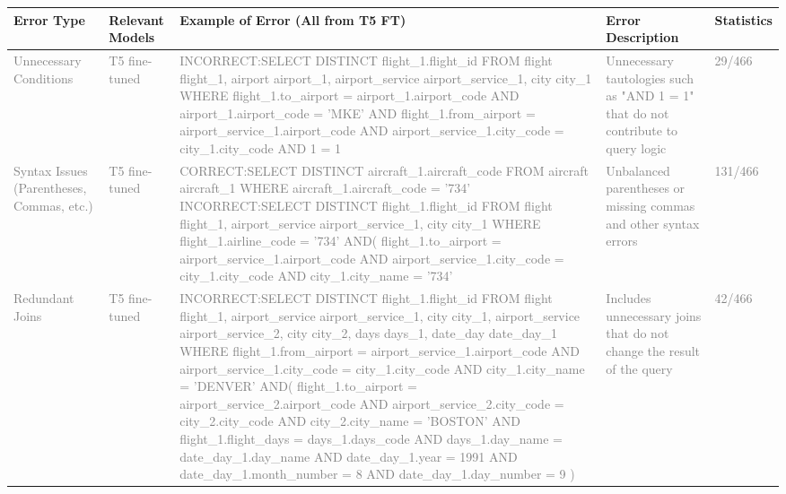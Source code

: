 \documentclass{article}
\begin{document}
\begin{landscape}
\begin{table}
  \centering
  \begin{tabular}{p{2cm}p{2cm}p{10cm}p{6cm}p{2cm}}
    \toprule
    \textbf{Error Type} & \textbf{Relevant Models} & \textbf{Example of Error (All from T5 FT)} & \textbf{Error Description} & \textbf{Statistics} \\
    \midrule
    \textcolor{gray}{Unnecessary Conditions} & \textcolor{gray}{T5 fine-tuned} & \textcolor{gray}{INCORRECT:\newline SELECT DISTINCT flight\_1.flight\_id FROM flight flight\_1, airport airport\_1, airport\_service airport\_service\_1, city city\_1 WHERE flight\_1.to\_airport = airport\_1.airport\_code AND airport\_1.airport\_code = 'MKE' AND flight\_1.from\_airport = airport\_service\_1.airport\_code AND airport\_service\_1.city\_code = city\_1.city\_code AND 1 = 1} & \textcolor{gray}{Unnecessary tautologies such as "AND 1 = 1" that do not contribute to query logic} & \textcolor{gray}{29/466} \\
    \midrule
    \textcolor{gray}{Syntax Issues (Parentheses, Commas, etc.)} & \textcolor{gray}{T5 fine-tuned} & \textcolor{gray}{CORRECT:\newline SELECT DISTINCT aircraft\_1.aircraft\_code FROM aircraft aircraft\_1 WHERE aircraft\_1.aircraft\_code = '734' \newline \newline INCORRECT:\newline SELECT DISTINCT flight\_1.flight\_id FROM flight flight\_1, airport\_service airport\_service\_1, city city\_1 WHERE flight\_1.airline\_code = '734' AND( flight\_1.to\_airport = airport\_service\_1.airport\_code AND airport\_service\_1.city\_code = city\_1.city\_code AND city\_1.city\_name = '734'} & \textcolor{gray}{Unbalanced parentheses or missing commas and other syntax errors} & \textcolor{gray}{131/466} \\
    \midrule
    \textcolor{gray}{Redundant Joins} & \textcolor{gray}{T5 fine-tuned} & \textcolor{gray}{INCORRECT:\newline SELECT DISTINCT flight\_1.flight\_id FROM flight flight\_1, airport\_service airport\_service\_1, city city\_1, airport\_service airport\_service\_2, city city\_2, days days\_1, date\_day date\_day\_1 WHERE flight\_1.from\_airport = airport\_service\_1.airport\_code AND airport\_service\_1.city\_code = city\_1.city\_code AND city\_1.city\_name = 'DENVER' AND( flight\_1.to\_airport = airport\_service\_2.airport\_code AND airport\_service\_2.city\_code = city\_2.city\_code AND city\_2.city\_name = 'BOSTON' AND flight\_1.flight\_days = days\_1.days\_code AND days\_1.day\_name = date\_day\_1.day\_name AND date\_day\_1.year = 1991 AND date\_day\_1.month\_number = 8 AND date\_day\_1.day\_number = 9 )} & \textcolor{gray}{Includes unnecessary joins that do not change the result of the query} & \textcolor{gray}{42/466} \\

\end{tabular}
\end{table}
\end{landscape}
\end{document}
